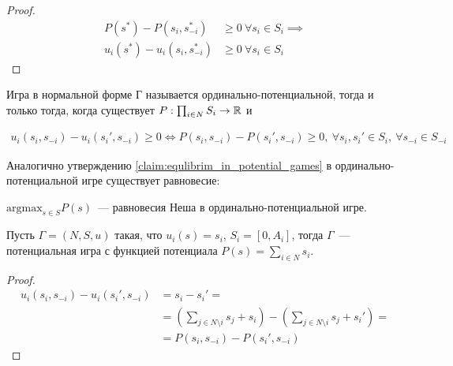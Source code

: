 \documentclass[../main.tex]{subfiles}
\begin{document}
\begin{proof}
	\begin{align*}
		P(s^*) - P(s_i, s_{-i}^*) &\geqslant 0 \ \forall s_i \in S_i \implies \\
		u_i(s^*) - u_i(s_i, s^*_{-i}) &\geqslant 0 \ \forall s_i \in S_i
	\end{align*}
\end{proof}

\begin{df}
	Игра в нормальной форме Г называется ординально-потенциальной, тогда и только тогда, когда существует $P: \prod_{i \in N} S_i \to \mathbb{R}$ и

	\begin{align*}
		u_i(s_i, s_{-i}) - u_i(s_i', s_{-i}) \geqslant 0 \iff P(s_i, s_{-i}) - P(s_i', s_{-i}) \geqslant 0, \ \forall s_i, s_i' \in S_i, \ \forall s_{-i} \in S_{-i}
	\end{align*}

\end{df}

Аналогично утверждению \ref{claim:equlibrim_in_potential_games} в ординально-потенциальной игре существует равновесие:

\begin{claim}
  $\text{argmax}_{s\in S} P(s)$~--- равновесия Неша в ординально-потенциальной игре.  
\end{claim}

\begin{exmpl}
	Пусть $\Gamma = (N, S, u)$ такая, что $u_i(s) = s_i$, $S_i = [0, A_i]$, тогда  $\Gamma$~--- потенциальная игра с функцией потенциала $P(s) = \sum_{i \in N} s_i$.

	\begin{proof}
		
	  \begin{align*}
		u_i(s_i, s_{-i}) - u_i(s_i', s_{-i}) &= s_i - s_i' = \\
						     &= \left(\sum_{j \in N \setminus i} s_j + s_i\right) - \left(\sum_{j \in N \setminus i} s_j + s_i'\right) = \\ 
						     &= P(s_i, s_{-i}) - P(s_i', s_{-i})
	  \end{align*}
	\end{proof}
\end{exmpl}
\end{document}
